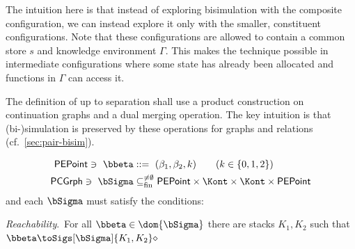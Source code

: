 The intuition here is that instead of exploring bisimulation with the composite configuration, we can instead explore it only with the smaller, constituent configurations. Note that these configurations are allowed to contain a common store $s$ and knowledge environment $\Gamma$. This makes the technique possible in intermediate configurations where some state has already been allocated and functions in $\Gamma$ can access it.

The definition of up to separation shall use a product construction on continuation graphs and a dual merging operation. The key intuition is that (bi-)simulation is preserved by these operations for graphs and relations (cf.~\cref{sec:pair-bisim}).


\begin{definition}
  \begin{align*}
    \mathsf{PEPoint} \ni \ \bbeta &::=\ (\beta_1, \beta_2, k)  \qquad (k\in\{0,1,2\})\\
    \mathsf{PCGrph}\ni \ \bSigma &\subseteq_{\rm fin}^{\neq\emptyset} \mathsf{PEPoint}\times\Kont\times\Kont\times\mathsf{PEPoint}
  \end{align*}
 and each $\bSigma$ must satisfy the conditions: %
  \begin{compactitem}
  \item{} \emph{Reachability}.~For all $\bbeta\in\dom{\bSigma}$ there are stacks $K_1,K_2$ such that $\bbeta\toSigs[\bSigma]{K_1,K_2}\diamond$


\end{compactitem}
\end{definition}
